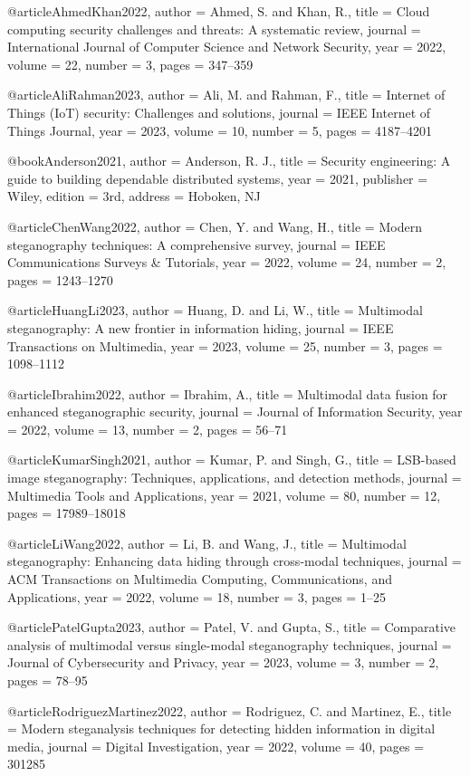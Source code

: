 \documentclass[12pt, a4paper, oneside]{book}
\begin{document}
\begin{thebibliography}{99}
@article{AhmedKhan2022,
  author = {Ahmed, S. and Khan, R.},
  title = {Cloud computing security challenges and threats: A systematic review},
  journal = {International Journal of Computer Science and Network Security},
  year = {2022},
  volume = {22},
  number = {3},
  pages = {347--359}
}

@article{AliRahman2023,
  author = {Ali, M. and Rahman, F.},
  title = {Internet of Things (IoT) security: Challenges and solutions},
  journal = {IEEE Internet of Things Journal},
  year = {2023},
  volume = {10},
  number = {5},
  pages = {4187--4201}
}

@book{Anderson2021,
  author = {Anderson, R. J.},
  title = {Security engineering: A guide to building dependable distributed systems},
  year = {2021},
  publisher = {Wiley},
  edition = {3rd},
  address = {Hoboken, NJ}
}

@article{ChenWang2022,
  author = {Chen, Y. and Wang, H.},
  title = {Modern steganography techniques: A comprehensive survey},
  journal = {IEEE Communications Surveys \& Tutorials},
  year = {2022},
  volume = {24},
  number = {2},
  pages = {1243--1270}
}

@article{HuangLi2023,
  author = {Huang, D. and Li, W.},
  title = {Multimodal steganography: A new frontier in information hiding},
  journal = {IEEE Transactions on Multimedia},
  year = {2023},
  volume = {25},
  number = {3},
  pages = {1098--1112}
}

@article{Ibrahim2022,
  author = {Ibrahim, A.},
  title = {Multimodal data fusion for enhanced steganographic security},
  journal = {Journal of Information Security},
  year = {2022},
  volume = {13},
  number = {2},
  pages = {56--71}
}

@article{KumarSingh2021,
  author = {Kumar, P. and Singh, G.},
  title = {LSB-based image steganography: Techniques, applications, and detection methods},
  journal = {Multimedia Tools and Applications},
  year = {2021},
  volume = {80},
  number = {12},
  pages = {17989--18018}
}

@article{LiWang2022,
  author = {Li, B. and Wang, J.},
  title = {Multimodal steganography: Enhancing data hiding through cross-modal techniques},
  journal = {ACM Transactions on Multimedia Computing, Communications, and Applications},
  year = {2022},
  volume = {18},
  number = {3},
  pages = {1--25}
}

@article{PatelGupta2023,
  author = {Patel, V. and Gupta, S.},
  title = {Comparative analysis of multimodal versus single-modal steganography techniques},
  journal = {Journal of Cybersecurity and Privacy},
  year = {2023},
  volume = {3},
  number = {2},
  pages = {78--95}
}

@article{RodriguezMartinez2022,
  author = {Rodriguez, C. and Martinez, E.},
  title = {Modern steganalysis techniques for detecting hidden information in digital media},
  journal = {Digital Investigation},
  year = {2022},
  volume = {40},
  pages = {301285}
}

\end{thebibliography}
\end{document}
